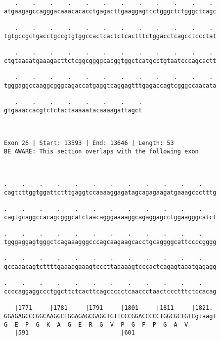 \documentclass{article}
\begin{document}
\begin{Verbatim}
   .    .    .    .    .    .    .    .    .    .    .    . 
atgaagagccagggacaaacacacctgagacttgaaggagtcctgggctctgggctcagc
                                                            
   .    .    .    .    .    .    .    .    .    .    .    . 
tgtgccgctgacctgccgtgtggccactcactctcactttctggacctcagcctccctat
                                                            
   .    .    .    .    .    .    .    .    .    .    .    . 
ctgtaaaatgaaagacttctcggcggggcacggtggctcatgcctgtaatcccagcactt
                                                            
   .    .    .    .    .    .    .    .    .    .    .    . 
tgggaggccaaggcgggcagaccatgaggtcaggagtttgagaccagtcgggccaacata
                                                            
   .    .    .    .    .    .    .    .
gtgaaaccacgtctctactaaaaatacaaaagattagct
                                       
                                       
 
Exon 26 | Start: 13593 | End: 13646 | Length: 53
BE AWARE: This section overlaps with the following exon



.    .    .    .    .    .    .    .    .    .    .    .    
cagtcttggtggattctttgaggtccaaaaggagatagcagagaagatgaaagccctttg
                                                            
.    .    .    .    .    .    .    .    .    .    .    .    
cagtgcaggccacagcgggcatctaacagggaaaaggcagaggagcctggaagggcatct
                                                            
.    .    .    .    .    .    .    .    .    .    .    .    
tgggaggagtgggctcagaaagggcccagcaagaagcacctgcaggggcattccccgggg
                                                            
.    .    .    .    .    .    .    .    .    .    .    .    
gccaaacagtcttttgaaaagaaagtcccttaaaaagtcccactcagagtaaatgagagg
                                                            
.    .    .    .    .    .    .    .    .    .    .    .    
ccccaggaggccctggcttctcacttcagccccctcaaccctaactccctttctccacag
                                                            
   |1771     |1781     |1791     |1801     |1811     |1821. 
GGAGAGCCCGGCAAGGCTGGAGAGCGAGGTGTTCCCGGACCCCCTGGCGCTGTCgtaagt
G  E  P  G  K  A  G  E  R  G  V  P  G  P  P  G  A  V        
   |591                          |601                       
  

\end{Verbatim}
\end{document}
